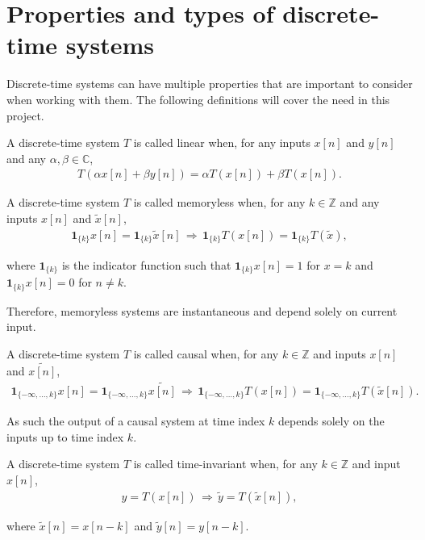 \section{Properties and types of discrete-time systems}\label{sec:properties_DTS}
Discrete-time systems can have multiple properties that are important to consider when working with them. The following definitions will cover the need in this project.
\begin{definition}\label{def:linear_system}
A discrete-time system $T$ is called linear when, for any inputs $x[n]$ and $y[n]$ and any $\alpha,\beta\in\mathbb{C}$,
\begin{align}
T(\alpha x[n] + \beta y[n]) = \alpha T(x[n]) + \beta T(x[n]).
\end{align}
\end{definition}

\begin{definition}\label{def:memoryless_system}
A discrete-time system $T$ is called memoryless when, for any $k\in\mathbb{Z}$ and any inputs $x[n]$ and $\tilde{x}[n]$,
\begin{align}
\mathbf{1}_{\{k\}}x[n] = \mathbf{1}_{\{k\}}\tilde{x}[n] \, \Rightarrow \, \mathbf{1}_{\{k\}} T(x[n]) = \mathbf{1}_{\{k\}}T(\tilde{x}),
\end{align}

where $\mathbf{1}_{\{k\}}$ is the indicator function such that $\mathbf{1}_{\{k\}}x[n]=1$ for $x=k$ and $\mathbf{1}_{\{k\}}x[n]=0$ for $n \neq k$.
\end{definition}

Therefore, memoryless systems are instantaneous and depend solely on current input.

\begin{definition}\label{def:causal_system}
A discrete-time system $T$ is called causal when, for any $k\in\mathbb{Z}$ and inputs $x[n]$ and $\tilde{x[n]}$,
\begin{align}
\mathbf{1}_{\{-\infty,\ldots,k\}} x[n] = \mathbf{1}_{\{-\infty,\ldots,k\}} \tilde{x[n]} \, \Rightarrow \, \mathbf{1}_{\{-\infty,\ldots,k\}} T(x[n]) = \mathbf{1}_{\{-\infty,\ldots,k\}} T(\tilde{x}[n]).
\end{align}
\end{definition}

As such the output of a causal system at time index $k$ depends solely on the inputs up to time index $k$.

\begin{definition}\label{def:time_invariant_system}
A discrete-time system $T$ is called time-invariant when, for any $k\in\mathbb{Z}$ and input $x[n]$,
\begin{align}
y = T(x[n]) \, \Rightarrow \, \tilde{y} = T(\tilde{x}[n]),
\end{align}

where $\tilde{x}[n] = x[n-k]$ and $\tilde{y}[n] = y[n-k]$.
\end{definition}

